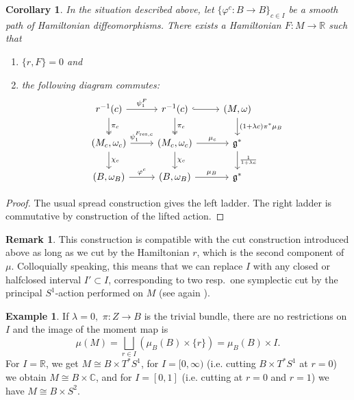 \documentclass[10pt,oneside,reqno]{amsart}
\newtheorem{corollary}[theorem]{Corollary}
\theoremstyle{definition}
\newtheorem*{remark}{Remark}
\newtheorem{example}[theorem]{Example}
\newcommand{\fg}{\mathfrak{g}}
\newcommand{\IR}{\mathbb{R}}
\newcommand{\IC}{\mathbb{C}}
\newcommand{\resc}{{\textup{res},c}}
\begin{document}
\begin{corollary}
   In the situation described above, let $\{\varphi^c:B\to B \}_{c\in I}$ be a smooth path of Hamiltonian diffeomorphisms. There exists a Hamiltonian $F:M\to \IR$ such that
   \begin{enumerate}
       \item $\{r,F\} = 0$ and
       \item the following diagram commutes:
       \begin{equation*}
           \begin{tikzcd}
r^{-1}(c) \arrow[r, "\psi^F_1"] \arrow[d, "\pi_c", two heads]      & r^{-1}(c) \arrow[d, "\pi_c", two heads] \arrow[r, hook] & {(M,\omega)} \arrow[d, "(1+\lambda c)\pi^*\mu_B"]   \\
{(M_c,\omega_c)} \arrow[r, "\psi^{F_\resc}_1"] \arrow[d, "\chi_c"] & {(M_c,\omega_c)} \arrow[r, "\mu_c"] \arrow[d, "\chi_c"] & \fg^* \arrow[d, "\frac{1}{1+\lambda c}"] \\
{(B,\omega_B)} \arrow[r, "\varphi^c"]                              & {(B,\omega_B)} \arrow[r, "\mu_B"]                         & \fg^*                               
\end{tikzcd}
       \end{equation*}
   \end{enumerate}
\end{corollary}
\begin{proof}
    The usual spread construction gives the left ladder. The right ladder is commutative by construction of the lifted action.
\end{proof}
\begin{remark}
    This construction is compatible with the cut construction introduced above as long as we cut by the Hamiltonian $r$, which is the second component of $\mu$. Colloquially speaking, this means that we can replace $I$ with any closed or halfclosed interval $I'\subset I$, corresponding to two resp.\ one symplectic cut by the principal $S^1$-action performed on $M$ (see again \cite{lerman1995symplectic}). 
\end{remark}

\begin{example}
    If $\lambda=0,$ $\pi:Z\to B$ is the trivial bundle, there are no restrictions on $I$ and the image of the moment map is 
    \begin{equation*}
        \mu(M) = \bigsqcup_{r\in I}\left(\mu_B(B) \times \{r\}\right) = \mu_B(B) \times I.
    \end{equation*}
    For $I=\IR$, we get $M \cong B\times T^*S^1$, for $I=[0,\infty)$ (i.e. cutting $B\times T^*S^1$ at $r=0$) we obtain $M\cong B\times \IC$, and for $I=[0,1]$ (i.e. cutting at $r=0$ and $r=1$) we have $M \cong B\times S^2.$
\end{example}
\end{document}
